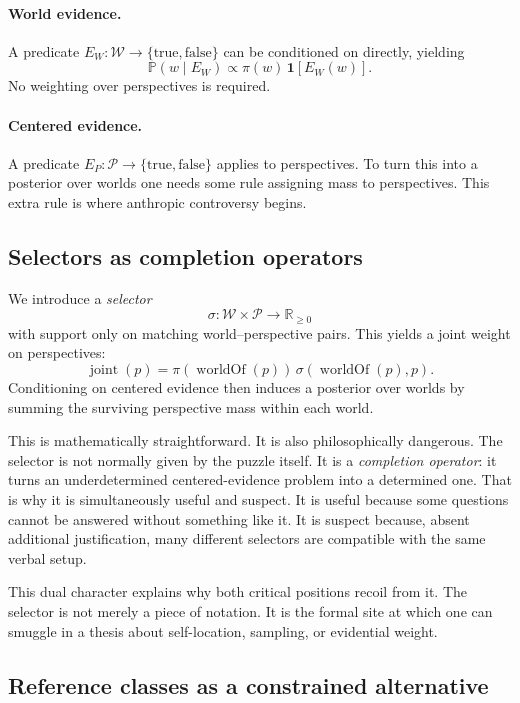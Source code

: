 \documentclass[11pt]{article}
\newcommand{\Pp}{\mathbb{P}}
\newcommand{\1}{\mathbf{1}}
\newcommand{\W}{\mathcal{W}}
\newcommand{\Persp}{\mathcal{P}}
\begin{document}
\paragraph{World evidence.} A predicate $E_W : \W \to \{\text{true},\text{false}\}$ can be conditioned on directly, yielding
\[
\Pp(w \mid E_W) \propto \pi(w)\,\1[E_W(w)].
\]
No weighting over perspectives is required.

\paragraph{Centered evidence.} A predicate $E_P : \Persp \to \{\text{true},\text{false}\}$ applies to perspectives. 
To turn this into a posterior over worlds one needs some rule assigning mass to perspectives. This extra rule is where anthropic controversy begins.

\subsection{Selectors as completion operators}

We introduce a \emph{selector}
\[
\sigma : \W \times \Persp \to \mathbb{R}_{\ge 0}
\]
with support only on matching world--perspective pairs. This yields a joint weight on perspectives:
\[
\operatorname{joint}(p) = \pi(\operatorname{worldOf}(p))\,\sigma(\operatorname{worldOf}(p), p).
\]
Conditioning on centered evidence then induces a posterior over worlds by summing the surviving perspective mass within each world.

This is mathematically straightforward. It is also philosophically dangerous. The selector is not normally given by the puzzle itself. It is a \emph{completion operator}: it turns an underdetermined centered-evidence problem into a determined one. That is why it is simultaneously useful and suspect. It is useful because some questions cannot be answered without something like it. It is suspect because, absent additional justification, many different selectors are compatible with the same verbal setup.

This dual character explains why both critical positions recoil from it. The selector is not merely a piece of notation. It is the formal site at which one can smuggle in a thesis about self-location, sampling, or evidential weight.

\subsection{Reference classes as a constrained alternative}
\end{document}
